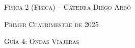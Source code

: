 \documentclass[11pt,spanish]{article}
\begin{document}
    \begin{center}
    \textsc{\large Física 2 (Física) -- Cátedra Diego Arbó}
    \par\end{center}{\large \par}
    
    \begin{center}
    \textsc{\large Primer Cuatrimestre de 2025}
    \par\end{center}{\large \par}
    
    \begin{center}
    \textsc{\large Guía 4: Ondas Viajeras}
    \par\end{center}{\large \par}
\end{document}
